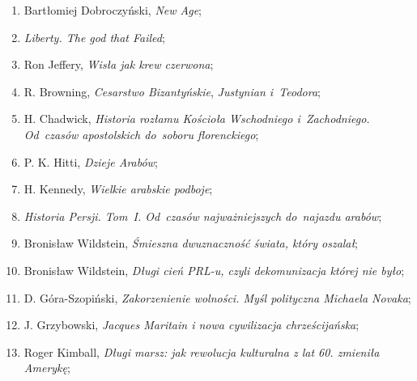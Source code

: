 \documentclass[a4paper,11pt]{article}
\begin{document}
\begin{enumerate}
\item Bartłomiej Dobroczyński, \textit{New Age};



\item \textit{Liberty. The god that Failed};



\item Ron Jeffery, \textit{Wisła jak krew czerwona};



\item R. Browning, \textit{Cesarstwo Bizantyńskie}, \textit{Justynian
    i~Teodora};



\item H. Chadwick, \textit{Historia rozłamu Kościoła Wschodniego
    i~Zachodniego. Od~czasów apostolskich do~soboru florenckiego};



\item P. K. Hitti, \textit{Dzieje Arabów};



\item H. Kennedy, \textit{Wielkie arabskie podboje};



\item \textit{Historia Persji. Tom~I. Od~czasów najważniejszych
    do~najazdu arabów};



\item Bronisław Wildstein, \textit{Śmieszna dwuznaczność świata, który
    oszalał};



\item Bronisław Wildstein, \textit{Długi cień PRL-u, czyli dekomunizacja
    której nie było};



\item D. Góra-Szopiński, \textit{Zakorzenienie wolności. Myśl polityczna
    Michaela Novaka};



\item J. Grzybowski, \textit{Jacques Maritain i nowa cywilizacja
    chrześcijańska};



\item Roger Kimball, \textit{Długi marsz: jak rewolucja kulturalna z lat
    60. zmieniła Amerykę};





\end{enumerate}
\end{document}
